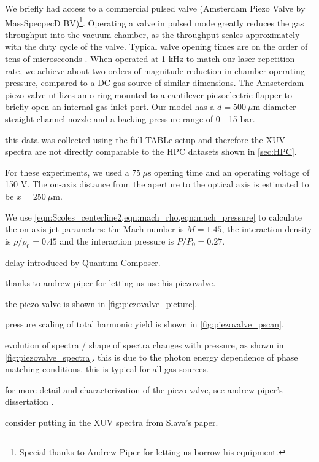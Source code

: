 We briefly had access to a commercial pulsed valve (Amsterdam Piezo Valve by MassSpecpecD BV)\footnote{Special thanks to Andrew Piper for letting us borrow his equipment.}. Operating a valve in pulsed mode greatly reduces the gas throughput into the vacuum chamber, as the throughput scales approximately with the duty cycle of the valve. Typical valve opening times are on the order of tens of microseconds \cite{irimiaSituCharacterizationCold2009,mengMeasurementDensityProfile2015,irimiaShortPulseMicrosecond2009}. When operated at 1 kHz to match our laser repetition rate, we achieve about two orders of magnitude reduction in chamber operating pressure, compared to a DC gas source of similar dimensions. The Amseterdam piezo valve utilizes an o-ring mounted to a cantilever piezoelectric flapper to briefly open an internal gas inlet port. Our model has a $d = 500 \ \mu \textrm{m}$ diameter straight-channel nozzle and a backing pressure range of 0 - 15 bar.

this data was collected using the full TABLe setup and therefore the XUV spectra are not directly comparable to the HPC datasets shown in \cref{sec:HPC}.

For these experiments, we used a $75 \ \mu \textrm{s}$ opening time and an operating voltage of 150 V. The on-axis distance from the aperture to the optical axis is estimated to be $x = 250 \ \mu \textrm{m}$.

We use \cref{eqn:Scoles_centerline2,eqn:mach_rho,eqn:mach_pressure} to calculate the on-axis jet parameters: the Mach number is $M=1.45$, the interaction density is $\rho/\rho_0 = 0.45$ and the interaction pressure is $P/P_0 = 0.27$.

delay introduced by Quantum Composer.

thanks to andrew piper for letting us use his piezovalve.

the piezo valve is shown in \cref{fig:piezovalve_picture}.

pressure scaling of total harmonic yield is shown in \cref{fig:piezovalve_pscan}.

evolution of spectra / shape of spectra changes with pressure, as shown in \cref{fig:piezovalve_spectra}. this is due to the photon energy dependence of phase matching conditions. this is typical for all gas sources.

for more detail and characterization of the piezo valve, see andrew piper's dissertation \cite{piperAndrewPiperDissertation2022}.

consider putting in the XUV spectra from Slava's paper.

